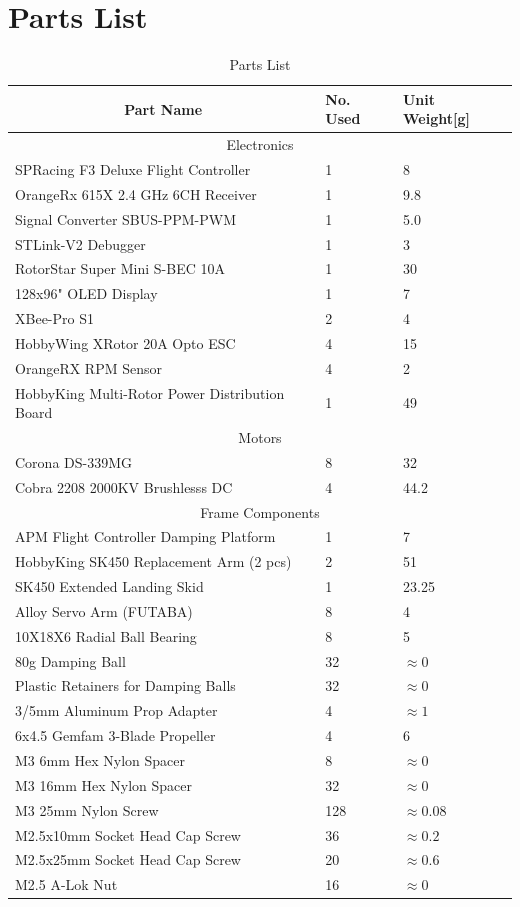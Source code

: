 \section{Parts List}
\begin{table}[htbp]
\centering
\begin{tabularx}{\textwidth}{|X|l|l|}
\hline
\multicolumn{1}{|c|}{Part Name} & No. Used & Unit Weight[g]\\ \hline
\multicolumn{3}{|c|}{Electronics}\\ \hline
SPRacing F3 Deluxe Flight Controller & 1 & 8\\ \hline
OrangeRx 615X 2.4 GHz 6CH Receiver & 1 & 9.8\\ \hline
Signal Converter SBUS-PPM-PWM & 1 & 5.0\\ \hline 
STLink-V2 Debugger & 1 & 3\\ \hline
RotorStar Super Mini S-BEC 10A & 1 & 30\\ \hline
128x96" OLED Display & 1 & 7 \\ \hline
XBee-Pro S1 & 2 & 4 \\ \hline
HobbyWing XRotor 20A Opto ESC & 4 & 15\\ \hline
OrangeRX RPM Sensor & 4 & 2\\ \hline
HobbyKing Multi-Rotor Power Distribution Board & 1 & 49\\ \hline
\multicolumn{3}{|c|}{Motors}\\ \hline
Corona DS-339MG & 8 & 32\\ \hline
Cobra 2208 2000KV Brushlesss DC & 4 & 44.2\\ \hline
\multicolumn{3}{|c|}{Frame Components}\\ \hline
APM Flight Controller Damping Platform & 1 & 7\\ \hline
HobbyKing SK450 Replacement Arm (2 pcs) & 2 & 51\\ \hline
SK450 Extended Landing Skid & 1 & 23.25\\ \hline
Alloy Servo Arm (FUTABA) & 8 & 4\\ \hline
10X18X6 Radial Ball Bearing & 8 & 5\\ \hline
80g Damping Ball & 32 & $\approx 0$\\ \hline
Plastic Retainers for Damping Balls & 32 & $\approx 0$\\ \hline
3/5mm Aluminum Prop Adapter & 4 & $\approx 1$\\ \hline
6x4.5 Gemfam 3-Blade Propeller & 4 & 6\\ \hline
M3 6mm Hex Nylon Spacer & 8 & $\approx 0$\\ \hline
M3 16mm Hex Nylon Spacer & 32 & $\approx 0$\\ \hline
M3 25mm Nylon Screw & 128 & $\approx 0.08$\\ \hline
M2.5x10mm Socket Head Cap Screw & 36 & $\approx 0.2$\\ \hline
M2.5x25mm Socket Head Cap Screw & 20 & $\approx 0.6$\\ \hline
M2.5 A-Lok Nut & 16 & $\approx 0$\\ \hline 
\end{tabularx}
\label{tab:partslist}
\caption{Parts List}
\end{table}
